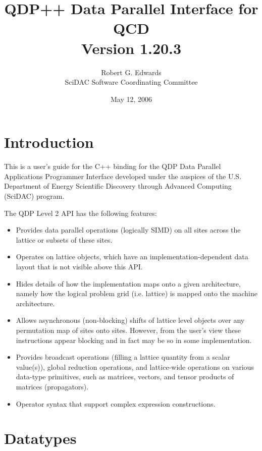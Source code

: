 \documentclass[12pt,letterpaper]{article}
\newcommand{\cpp}{C++}
\begin{document}
\title{
   QDP++ Data Parallel Interface for QCD  \\{\large Version 1.20.3}
}
\author{Robert G. Edwards\\
SciDAC Software Coordinating Committee}

\date{May 12, 2006}

\maketitle
\section{Introduction}
This is a user's guide for the \cpp{} binding for the QDP Data Parallel
Applications Programmer Interface developed under the auspices of the
U.S. Department of Energy Scientific Discovery through Advanced
Computing (SciDAC) program.

The QDP Level 2 API has the following features:
\begin{itemize}
\item Provides data parallel operations (logically SIMD) on all sites
across the lattice or subsets of these sites.
\item Operates on lattice objects, which have an
implementation-dependent data layout that is not visible above this
API.
\item Hides details of how the implementation maps onto a given
architecture, namely how the logical problem grid (i.e. lattice) is
mapped onto the machine architecture.
\item Allows asynchronous (non-blocking) shifts of lattice level
objects over any permutation map of sites onto sites. However, from
the user's view these instructions appear blocking and in fact may be
so in some implementation.
\item Provides broadcast operations (filling a lattice quantity from a
scalar value(s)), global reduction operations, and lattice-wide
operations on various data-type primitives, such as matrices, vectors,
and tensor products of matrices (propagators).
\item
Operator syntax that support complex expression constructions.
\end{itemize}

\section{Datatypes}
\label{sec.datatypes}
\end{document}
